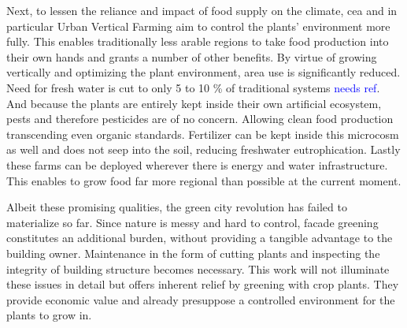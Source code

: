 Next, to lessen the reliance and impact of food supply on the climate, \ac{cea} and in particular Urban Vertical Farming aim to control the plants' environment more fully.
This enables traditionally less arable regions to take food production into their own hands and grants a number of other benefits. %
By virtue of growing vertically and optimizing the plant environment, area use is significantly reduced.
Need for fresh water is cut to only 5 to 10 \% of traditional systems \textcolor{Blue}{needs ref}. %
And because the plants are entirely kept inside their own artificial ecosystem, pests and therefore pesticides are of no concern.
Allowing clean food production transcending even organic standards.
Fertilizer can be kept inside this microcosm as well and does not seep into the soil, reducing freshwater eutrophication.
Lastly these farms can be deployed wherever there is energy and water infrastructure.
This enables to grow food far more regional than possible at the current moment.

Albeit these promising qualities, the green city revolution has failed to materialize so far.
Since nature is messy and hard to control, facade greening constitutes an additional burden, without providing a tangible advantage to the building owner.
Maintenance in the form of cutting plants and inspecting the integrity of building structure becomes necessary.
This work will not illuminate these issues in detail but offers inherent relief by greening with crop plants.
They provide economic value and already presuppose a controlled environment for the plants to grow in.

